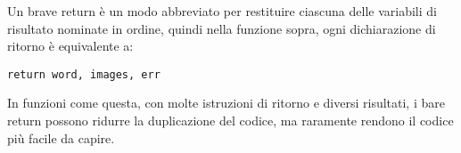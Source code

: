 \documentclass[../../thesis.tex]{subfiles}
\begin{document}
    Un brave return è un modo abbreviato per restituire ciascuna delle variabili di risultato nominate in ordine, quindi nella funzione sopra, ogni dichiarazione di ritorno è equivalente a:
    \begin{lstlisting}[frame = single, label = {lst:lstlisting4-3.6}]
return word, images, err
    \end{lstlisting}
    In funzioni come questa, con molte istruzioni di ritorno e diversi risultati, i bare return possono ridurre la duplicazione del codice, ma raramente rendono il codice più facile da capire.
\end{document}
